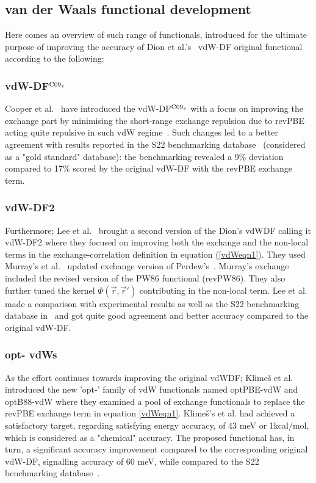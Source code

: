 \subsection{van der Waals functional development}
Here comes an overview of such range of functionals, introduced for the ultimate purpose of improving the accuracy of Dion et al.'s~\cite{Dion2004} vdW-DF original functional according to the following:
\subsubsection{vdW-DF$^{\textrm C09_x}$}
Cooper et al.~\cite{Cooper2010} have introduced the vdW-DF$^{\textrm C09_x}$ with a focus on improving the exchange part by minimising the short-range exchange repulsion due to revPBE acting quite repulsive in such vdW regime~\cite{Gulans2009, Murray2009}. Such changes led to a better agreement with results reported in the S22  benchmarking database~\cite{Jurecka2006} (considered as a "gold standard" database): the benchmarking revealed a 9\% deviation compared to 17\% scored by the original vdW-DF with the revPBE exchange term.
\subsubsection{vdW-DF2}    
Furthermore; Lee et al.~\cite{Lee2010DF2} brought a second version of the Dion's vdWDF calling it vdW-DF2 where they focused on improving both the exchange and the non-local terms in the exchange-correlation definition in equation (\ref{vdWeqn1}). They used Murray's et al.~\cite{Murray2009} updated exchange version of Perdew's~\cite{Perdew1986}. Murray's exchange included the revised version of the PW86 functional (revPW86). They also further tuned the kernel $\Phi(\vec{r},\vec{r}')$ contributing in the non-local term. Lee et al. made a comparison with experimental results as well as the S22 benchmarking database in~\cite{Jurecka2006} and got quite good agreement and better accuracy compared to the original vdW-DF.
\subsubsection{opt- vdWs}
As the effort continues towards improving the original vdWDF; Klimeš et al.~\cite{vdWDFopt} introduced the new 'opt-' family of vdW functionals named optPBE-vdW and optB88-vdW where they examined a pool of exchange functionals to replace the revPBE exchange term in equation \ref{vdWeqn1}. Klimeš's et al. had achieved a satisfactory target, regarding satisfying energy accuracy, of 43 meV or 1kcal/mol, which is considered as a "chemical" accuracy. The proposed functional has, in turn, a significant accuracy improvement compared to the corresponding original vdW-DF, signalling accuracy of 60 meV, while compared to the S22 benchmarking database~\cite{Jurecka2006}.
